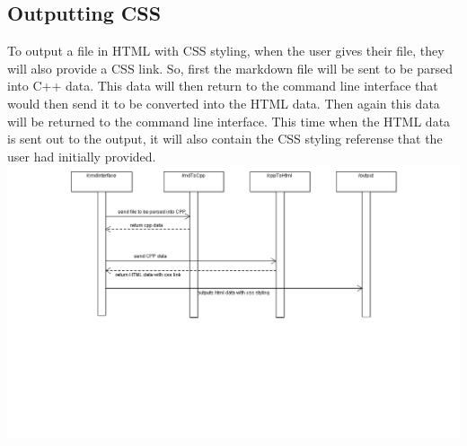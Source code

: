 \subsection{Outputting CSS}
To output a file in HTML with CSS styling, when the user gives their file, they will also provide a CSS link. So, first the markdown file will be sent to be parsed into C++ data. This data will then return to the command line interface that would then send it to be converted into the HTML data. Then again this data will be returned to the command line interface. This time when the HTML data is sent out to the output, it will also contain the CSS styling referense that the user had initially provided.  
\hspace{-5cm}\includegraphics[width=700pt]{images/Output.png}

